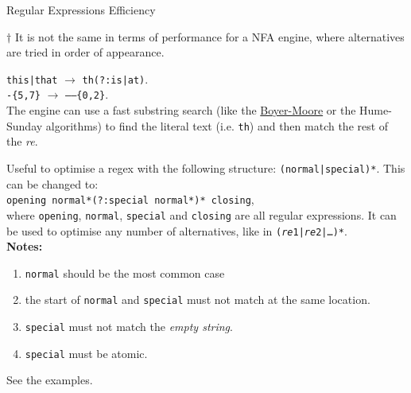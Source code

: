 \documentclass[10pt, a4paper, landscape]{scrartcl}
\newcommand{\regex}[1]{\texttt{#1}}
\newcommand{\cregex}[1]{\colorbox{gray!30}{\regex{#1}}}
\newcommand{\re}{\textit{re}}
\begin{document}
\begin{cheatsheet}{Regular Expressions Efficiency}
\begin{col2}
\begin{cheatnote}
$\dagger$ It is not the same in terms of performance for a NFA engine, where
alternatives are tried in order of appearance.\\
\end{cheatnote}


\cregex{this|that} $\to$ \cregex{th(?:is|at)}.\\
\cregex{-\{5,7\}} $\to$ \cregex{------\{0,2\}}.\\
The engine can use a fast substring search (like the
\href{https://en.wikipedia.org/wiki/Boyer–Moore_string_search_algorithm}{Boyer-Moore}
or the Hume-Sunday algorithms) to find the literal text (i.e. \cregex{th}) and
then match the rest of the \re.

\end{col2}

\begin{col3}


Useful to optimise a regex with the following structure:
\cregex{(normal|special)*}. This can be changed to:\\
\cregex{opening normal*(?:special normal*)* closing},\\
where \regex{opening}, \regex{normal}, \regex{special} and \regex{closing} are
all regular expressions. It can be used to optimise any number of alternatives,
like in \cregex{(\re{}1|\re{}2|\dots)*}.\\

\textbf{Notes:}
\begin{enumerate}
	\item \regex{normal} should be the most common case
	\item the start of \regex{normal} and \regex{special} must not match at the
		same location.
	\item \regex{special} must not match the \emph{empty string}.
	\item \regex{special} must be atomic.
\end{enumerate}
See the examples.

\end{col3}

\end{cheatsheet}

\newpage
\end{document}
